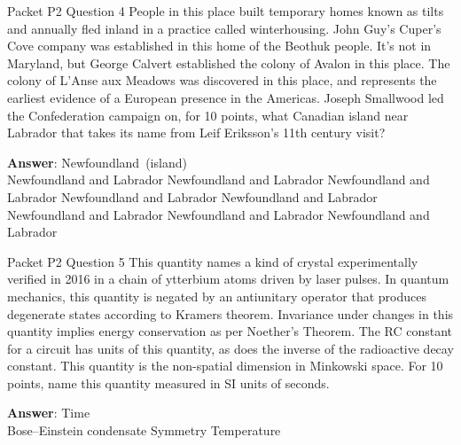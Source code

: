 \begin{frame}{Packet P2 Question 4}
People in this place built temporary homes known as tilts and annually fled inland in a practice called winterhousing. John Guy’s Cuper's Cove company was established in this home of the Beothuk people. It’s not in Maryland, but George Calvert established the colony of Avalon in this place. The colony of L'Anse aux Meadows was discovered in this place, and represents the earliest evidence of a European presence in the Americas. Joseph Smallwood led the Confederation   campaign on, for 10 points, what Canadian island near   Labrador that takes   its name from Leif Eriksson's 11th century   visit?        

\textbf{Answer}: Newfoundland\ (island)\\
 Newfoundland and Labrador
 Newfoundland and Labrador
 Newfoundland and Labrador
 Newfoundland and Labrador
 Newfoundland and Labrador
 Newfoundland and Labrador
 Newfoundland and Labrador
 Newfoundland and Labrador
\end{frame}

\begin{frame}{Packet P2 Question 5}
This quantity names a kind of crystal experimentally verified in 2016 in a chain of ytterbium atoms driven by laser pulses. In quantum mechanics,   this quantity is negated by an antiunitary operator that produces degenerate states according to Kramers theorem. Invariance under changes in this quantity   implies energy conservation as per Noether’s Theorem. The RC constant for a circuit has units of this quantity, as does the inverse of the radioactive decay constant. This quantity is the non-spatial dimension in Minkowski space. For 10 points, name this quantity measured in SI units of seconds.        

\textbf{Answer}: Time\\
 Bose–Einstein condensate
 Symmetry
 Temperature
\end{frame}

